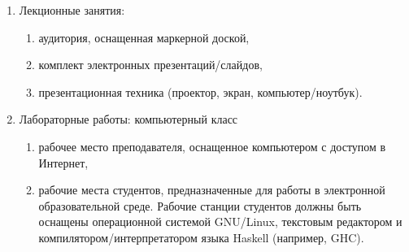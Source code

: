 
\begin{enumerate}
\item Лекционные занятия:
\begin{enumerate}
\item аудитория, оснащенная маркерной доской, \item комплект электронных презентаций/слайдов, \item презентационная техника (проектор, экран, компьютер/ноутбук).
\end{enumerate}
\item Лабораторные работы: компьютерный класс
\begin{enumerate}
\item рабочее место преподавателя, оснащенное компьютером с доступом в Интернет, 
\item рабочие места студентов, предназначенные для работы в электронной образовательной среде. Рабочие станции студентов должны быть оснащены операционной системой GNU/Linux, текстовым редактором и компилятором/интерпретатором языка Haskell (например, GHC).
\end{enumerate}
\end{enumerate}







